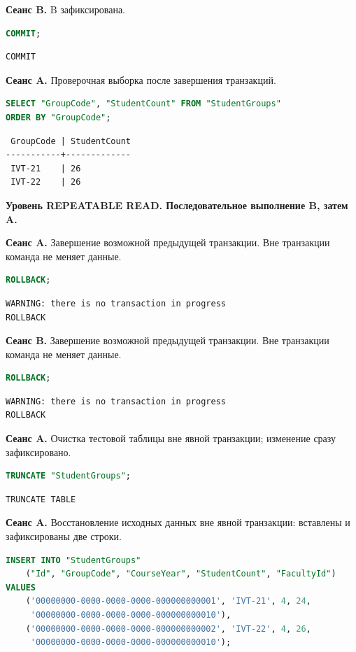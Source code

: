 \documentclass[12pt,a4paper]{article}
\begin{document}
\textbf{Сеанс B.} B зафиксирована.
\begin{lstlisting}[language=SQL]
COMMIT;
\end{lstlisting}

\begin{lstlisting}
COMMIT
\end{lstlisting}

\textbf{Сеанс A.} Проверочная выборка после завершения транзакций.
\begin{lstlisting}[language=SQL]
SELECT "GroupCode", "StudentCount" FROM "StudentGroups"
ORDER BY "GroupCode";
\end{lstlisting}

\begin{lstlisting}
 GroupCode | StudentCount
-----------+-------------
 IVT-21    | 26
 IVT-22    | 26
\end{lstlisting}

\textbf{Уровень REPEATABLE READ. Последовательное выполнение B, затем A.}

\textbf{Сеанс A.} Завершение возможной предыдущей транзакции. Вне транзакции команда не меняет данные.
\begin{lstlisting}[language=SQL]
ROLLBACK;
\end{lstlisting}

\begin{lstlisting}
WARNING: there is no transaction in progress
ROLLBACK
\end{lstlisting}

\textbf{Сеанс B.} Завершение возможной предыдущей транзакции. Вне транзакции команда не меняет данные.
\begin{lstlisting}[language=SQL]
ROLLBACK;
\end{lstlisting}

\begin{lstlisting}
WARNING: there is no transaction in progress
ROLLBACK
\end{lstlisting}

\textbf{Сеанс A.} Очистка тестовой таблицы вне явной транзакции; изменение сразу зафиксировано.
\begin{lstlisting}[language=SQL]
TRUNCATE "StudentGroups";
\end{lstlisting}

\begin{lstlisting}
TRUNCATE TABLE
\end{lstlisting}

\textbf{Сеанс A.} Восстановление исходных данных вне явной транзакции: вставлены и зафиксированы две строки.
\begin{lstlisting}[language=SQL]
INSERT INTO "StudentGroups"
    ("Id", "GroupCode", "CourseYear", "StudentCount", "FacultyId")
VALUES
    ('00000000-0000-0000-0000-000000000001', 'IVT-21', 4, 24,
     '00000000-0000-0000-0000-000000000010'),
    ('00000000-0000-0000-0000-000000000002', 'IVT-22', 4, 26,
     '00000000-0000-0000-0000-000000000010');
\end{lstlisting}
\end{document}
